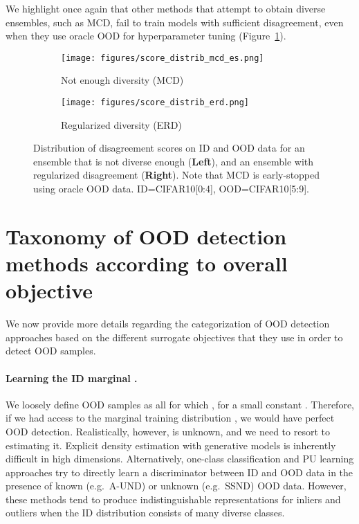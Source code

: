 We highlight once again that other methods that attempt to obtain diverse
ensembles, such as MCD, fail to train models with sufficient disagreement, even
when they use oracle OOD for hyperparameter tuning
(Figure~\ref{fig:scores_mcd_es}).

\begin{figure*}[h]
  \centering
  \begin{subfigure}[t]{0.3\textwidth}
    \centering
    \texttt{[image: figures/score\_distrib\_mcd\_es.png]}
    \caption{Not enough diversity (MCD)}
    \label{fig:scores_mcd_es}
  \end{subfigure}
\begin{subfigure}[t]{0.3\textwidth}
    \centering
    \texttt{[image: figures/score\_distrib\_erd.png]}
    \caption{Regularized diversity (ERD)}
    \label{fig:scores_erd}
  \end{subfigure}

\caption{Distribution of disagreement scores on ID and OOD data
  for an ensemble that is not diverse enough (\textbf{Left}), and an ensemble
  with regularized disagreement (\textbf{Right}). Note that MCD is early-stopped
  using oracle OOD data. ID=CIFAR10[0:4], OOD=CIFAR10[5:9].}


\end{figure*}







\section{Taxonomy of OOD detection methods according to overall objective}
\label{sec:appendix_related_work}

We now provide more details regarding the categorization of OOD detection
approaches based on the different surrogate objectives that they
use in order to detect OOD samples.

\paragraph{Learning the ID marginal .} We loosely define OOD samples as
all  for which , for a small constant .
Therefore, if we had access to the marginal training distribution ,
we would have perfect OOD detection. Realistically, however,  is
unknown, and we need to resort to estimating it. Explicit density estimation
with generative models \citep{ganomaly2018, nalisnick} is inherently
difficult in high dimensions. 
Alternatively, one-class classification \citep{mari2010, Ruff2020, sohn2021} and
PU learning approaches \citep{duPlessis14, Kiryo17} try to directly learn a
discriminator between ID and OOD data in the presence of known (e.g.\ A-UND) or
unknown (e.g.\ SSND) OOD data. However, these methods tend to produce
indistinguishable representations for inliers and outliers when the ID
distribution consists of many diverse classes.

